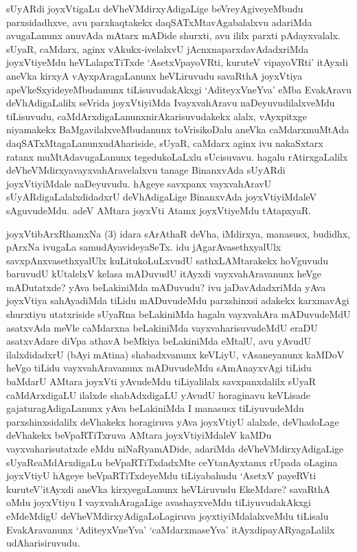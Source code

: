\begin{artha}
sUyARdi joyxVtigaLu deVheVMdirxyAdigaLige beVreyAgiveyeMbudu parxsidadhxve, avu parxkaqtakekx daqSATxMtavAgabalalxvu adariMda avugaLanunx anuvAda mAtarx mADide shurxti, avu ililx parxti pAdayxvalalx. sUyaR, caMdarx, aginx vAkukx-ivelalxvU jAcnxnaparxdavAdadxriMda joyxVtiyeMdu heVLalapxTiTxde `AsetxVpayoVRti, kuruteV vipayoVRti' itAyxdi aneVka kirxyA vAyxpAragaLanunx heVLiruvudu savaRthA joyxVtiya apeVkeSxyideyeMbudanunx tiLisuvudakAkxgi `AditeyxVneYva' eMba EvakAravu deVhAdigaLalilx seVrida joyxVtiyiMda I\break vayxvahAravu naDeyuvudilalxveMdu tiLisuvudu, caMdArxdigaLanunx\break nirAkarisuvudakekx alalx, vAyxpitxge niyamakekx BaMgavilalxveMbudanunx toVrisikoDalu aneVka caMdarxmuMtAda daqSATxMtagaLanunx\break udAhariside, sUyaR, caMdarx aginx ivu nakaSxtarx ratanx muMtAdavugaLanunx tegedukoLaLxlu sUcisuvavu. hagalu rAtirxgaLalilx deVheVMdirxya\-\break vayxvahAravelalxvu tanage BinanxvAda sUyARdi joyxVtiyiMdale naDeyuvudu. hAgeye savxpanx vayxvahAravU sUyARdigaLalalxdidadxrU deVhAdigaLige BinanxvAda joyxVtiyiMdaleV sAguvudeMdu. adeV AMtara joyxVti Atamx joyxVtiyeMdu tAtapxyaR.
\end{artha}


\begin{artha}%
joyxVtibArxRhamxNa (3) idara sArAthaR deVha, iMdirxya, manasusx, budidhx, pArxNa ivugaLa samudAyavideyaSeTx. idu jAgarAvasethxyalUlx savxpAnxvasethxyalUlx kuLitukoLuLxvudU sathxLAMtarakekx hoVguvudu baruvudU kUtalelxV kelasa mADuvudU itAyxdi vayxvahAravanunx heVge mADutatxde? yAva beLakiniMda mADuvudu? ivu jaDavAdadxriMda yAva joyxVtiya sahAyadiMda tiLidu mADuvudeMdu parxshinxsi adakekx karxmavAgi shurxtiyu utatxriside sUyaRna beLakiniMda hagalu vayxvahAra mADuvudeMdU asatxvAda meVle caMdarxna beLakiniMda vayxvaharisuvudeMdU eraDU asatxvAdare diVpa athavA beMkiya beLakiniMda eMtalU, avu yAvudU ilalxdidadxrU (bAyi mAtina) shabadxvanunx keVLiyU, vAsaneyanunx kaMDoV heVgo tiLidu vayxvahAravanunx mADuvudeMdu sAmAnayxvAgi tiLidu baMdarU AMtara joyxVti yAvudeMdu tiLiyalilalx savxpanxdalilx sUyaR caMdArxdigaLU ilalxde shabAdxdigaLU yAvudU horaginavu keVLisade gajaturagAdigaLanunx yAva beLakiniMda I manasusx tiLiyuvudeMdu parxshinxsidalilx deVhakekx horagiruva yAva joyxVtiyU alalxde, deVhadoLage deVhakekx beVpaRTiTxruva AMtara joyxVtiyiMdaleV kaMDu vayxvaharisutatxde eMdu niNaRya\break mADide, adariMda deVheVMdirxyAdigaLige sUyaRcaMdArxdigaLu beVpaRTiTxdadxMte ceYtanAyxtamx rUpada oLagina joyxVtiyU hAgeye beVpaRTiTxdeyeMdu tiLiyabahudu `AsetxV payeRVti kuruteV'\break itAyxdi aneVka kirxyegaLanunx heVLiruvudu EkeMdare? savaRthA oMdu joyxVtiyu I vayxvahAragaLige avashayxveMdu tiLiyuvudakAkxgi eMdeMdigU deVheVMdirxyAdigaLoLagiruva joyxtiyiMdalalxveMdu tiLisalu EvakAravanunx `AditeyxVneYva' `caMdarxmaseYva' itAyxdi\break payARyagaLalilx udAharisiruvudu.
\end{artha}

